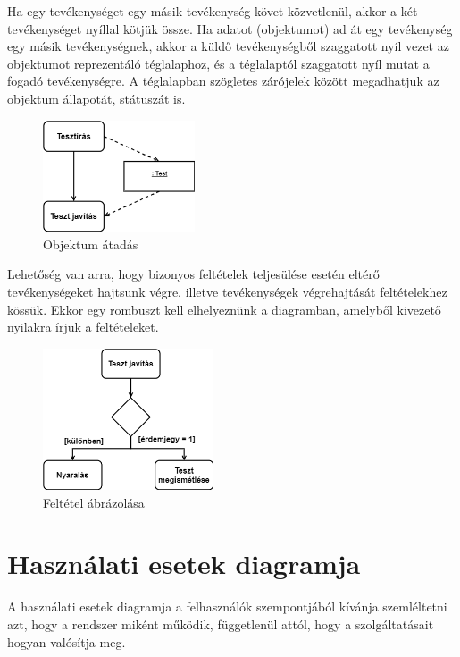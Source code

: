 \documentclass[12pt,margin=0px]{article}
\begin{document}
    \noindent Ha egy tevékenységet egy másik tevékenység követ közvetlenül, akkor a két tevékenységet nyíllal kötjük össze. Ha adatot (objektumot) ad át egy tevékenység egy másik tevékenységnek, akkor a küldő tevékenységből szaggatott nyíl vezet az objektumot reprezentáló téglalaphoz, és a téglalaptól szaggatott nyíl mutat a fogadó tevékenységre. A téglalapban szögletes zárójelek között megadhatjuk az objektum állapotát, státuszát is.
	\begin{figure}[H]
		\centering
		\includegraphics[width=0.4\textwidth]{img/tevekenyseg.png}
		\caption{Objektum átadás}
	\end{figure}
			
    \noindent Lehetőség van arra, hogy bizonyos feltételek teljesülése esetén eltérő tevékenységeket hajtsunk végre, illetve tevékenységek végrehajtását feltételekhez kössük. Ekkor egy rombuszt kell elhelyeznünk a diagramban, amelyből kivezető nyilakra írjuk a feltételeket.
			
	\begin{figure}[H]
		\centering
		\includegraphics[width=0.45\textwidth]{img/tevekenyseg2.png}
		\caption{Feltétel ábrázolása}
	\end{figure}

	\section*{Használati esetek diagramja}

    \noindent A használati esetek diagramja a felhasználók szempontjából kívánja szemléltetni azt, hogy a rendszer miként működik, függetlenül attól, hogy a szolgáltatásait hogyan valósítja meg.\\
		
\end{document}
